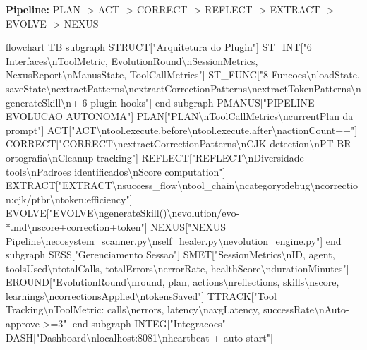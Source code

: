 \documentclass[
  12pt,
]{article}
\newenvironment{Shaded}{}{}
\newcommand{\NormalTok}[1]{#1}
\begin{document}
\textbf{Pipeline:} PLAN -\textgreater{} ACT -\textgreater{} CORRECT
-\textgreater{} REFLECT -\textgreater{} EXTRACT -\textgreater{} EVOLVE
-\textgreater{} NEXUS

\begin{Shaded}
\begin{Highlighting}[]
\NormalTok{flowchart TB}
\NormalTok{subgraph STRUCT["Arquitetura do Plugin"]}
\NormalTok{ST\_INT["6 Interfaces\textbackslash{}nToolMetric, EvolutionRound\textbackslash{}nSessionMetrics, NexusReport\textbackslash{}nManusState, ToolCallMetrics"]}
\NormalTok{ST\_FUNC["8 Funcoes\textbackslash{}nloadState, saveState\textbackslash{}nextractPatterns\textbackslash{}nextractCorrectionPatterns\textbackslash{}nextractTokenPatterns\textbackslash{}ngenerateSkill\textbackslash{}n+ 6 plugin hooks"]}
\NormalTok{end}
\NormalTok{subgraph PMANUS["PIPELINE EVOLUCAO AUTONOMA"]}
\NormalTok{PLAN["PLAN\textbackslash{}nToolCallMetrics\textbackslash{}ncurrentPlan da prompt"]}
\NormalTok{ACT["ACT\textbackslash{}ntool.execute.before\textbackslash{}ntool.execute.after\textbackslash{}nactionCount++"]}
\NormalTok{CORRECT["CORRECT\textbackslash{}nextractCorrectionPatterns\textbackslash{}nCJK detection\textbackslash{}nPT{-}BR ortografia\textbackslash{}nCleanup tracking"]}
\NormalTok{REFLECT["REFLECT\textbackslash{}nDiversidade tools\textbackslash{}nPadroes identificados\textbackslash{}nScore computation"]}
\NormalTok{EXTRACT["EXTRACT\textbackslash{}nsuccess\_flow\textbackslash{}ntool\_chain\textbackslash{}ncategory:debug\textbackslash{}ncorrection:cjk/ptbr\textbackslash{}ntoken:efficiency"]}
\NormalTok{EVOLVE["EVOLVE\textbackslash{}ngenerateSkill()\textbackslash{}nevolution/evo{-}*.md\textbackslash{}nscore+correction+token"]}
\NormalTok{NEXUS["NEXUS Pipeline\textbackslash{}necosystem\_scanner.py\textbackslash{}nself\_healer.py\textbackslash{}nevolution\_engine.py"]}
\NormalTok{end}
\NormalTok{subgraph SESS["Gerenciamento Sessao"]}
\NormalTok{SMET["SessionMetrics\textbackslash{}nID, agent, toolsUsed\textbackslash{}ntotalCalls, totalErrors\textbackslash{}nerrorRate, healthScore\textbackslash{}ndurationMinutes"]}
\NormalTok{EROUND["EvolutionRound\textbackslash{}nround, plan, actions\textbackslash{}nreflections, skills\textbackslash{}nscore, learnings\textbackslash{}ncorrectionsApplied\textbackslash{}ntokensSaved"]}
\NormalTok{TTRACK["Tool Tracking\textbackslash{}nToolMetric: calls\textbackslash{}nerrors, latency\textbackslash{}navgLatency, successRate\textbackslash{}nAuto{-}approve \textgreater{}=3"]}
\NormalTok{end}
\NormalTok{subgraph INTEG["Integracoes"]}
\NormalTok{DASH["Dashboard\textbackslash{}nlocalhost:8081\textbackslash{}nheartbeat + auto{-}start"]}

\end{Highlighting}
\end{Shaded}
\end{document}
